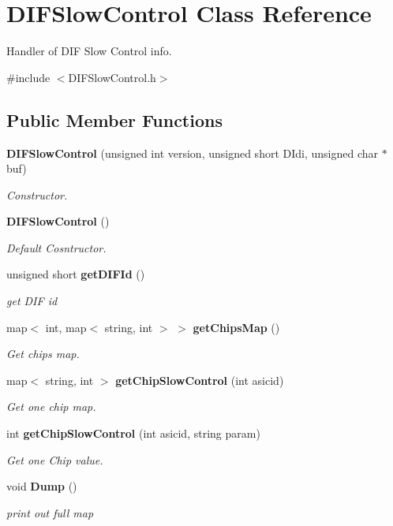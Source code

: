 \section{D\-I\-F\-Slow\-Control Class Reference}
\label{classDIFSlowControl}


Handler of D\-I\-F Slow Control info.  




{\ttfamily \#include $<$D\-I\-F\-Slow\-Control.\-h$>$}

\subsection*{Public Member Functions}
\begin{DoxyCompactItemize}
\item 
{\bf D\-I\-F\-Slow\-Control} (unsigned int version, unsigned short D\-Idi, unsigned char $\ast$buf)
\begin{DoxyCompactList}\small\item\em Constructor. \end{DoxyCompactList}\item 
{\bf D\-I\-F\-Slow\-Control} ()\label{classDIFSlowControl_a9ab99ff41ff746c990ca475d6edb4158}

\begin{DoxyCompactList}\small\item\em Default Cosntructor. \end{DoxyCompactList}\item 
unsigned short {\bf get\-D\-I\-F\-Id} ()\label{classDIFSlowControl_aa9709f45bc7dd629013f850ac8d3ef55}

\begin{DoxyCompactList}\small\item\em get D\-I\-F id \end{DoxyCompactList}\item 
map$<$ int, map$<$ string, int $>$ $>$ {\bf get\-Chips\-Map} ()
\begin{DoxyCompactList}\small\item\em Get chips map. \end{DoxyCompactList}\item 
map$<$ string, int $>$ {\bf get\-Chip\-Slow\-Control} (int asicid)
\begin{DoxyCompactList}\small\item\em Get one chip map. \end{DoxyCompactList}\item 
int {\bf get\-Chip\-Slow\-Control} (int asicid, string param)
\begin{DoxyCompactList}\small\item\em Get one Chip value. \end{DoxyCompactList}\item 
void {\bf Dump} ()\label{classDIFSlowControl_af5d12af4062366925fbe631687f987dd}

\begin{DoxyCompactList}\small\item\em print out full map \end{DoxyCompactList}\end{DoxyCompactItemize}


